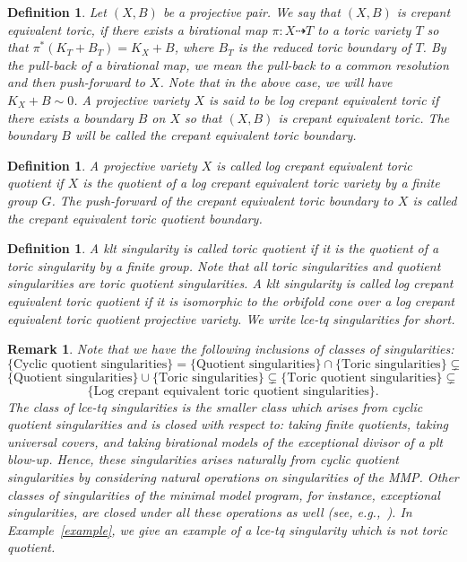 \documentclass{amsart}
\newtheorem{definition}[theorem]{Definition}
\newtheorem{remark}[theorem]{Remark}
\theoremstyle{remark}
\numberwithin{equation}{section}
\begin{document}
\begin{definition}{\em 
Let $(X,B)$ be a projective pair.
We say that $(X,B)$ is {\em crepant equivalent  toric},
if there exists a birational map $\pi\colon X\dashrightarrow T$ 
to a toric variety $T$ 
so that $\pi^*(K_T+B_T)=K_X+B$,
where $B_T$ is the reduced toric boundary of $T$.
By the pull-back of a birational map, we mean the pull-back to a common resolution and then push-forward to $X$.
Note that in the above case, we will have $K_X+B\sim 0$.
A projective variety $X$ is said to be
{\em log crepant equivalent  toric} if there exists a boundary $B$ on $X$ so that $(X,B)$ is crepant equivalent  toric.
The boundary $B$ will be called the {\em crepant equivalent  toric boundary}.
}
\end{definition}

\begin{definition}{\em 
A projective variety $X$ is called
{\em log crepant equivalent  toric quotient}
if $X$ is the quotient of a log crepant equivalent  toric variety by a finite group $G$.
The push-forward of the crepant equivalent  toric boundary to $X$ is called the {\em crepant equivalent  toric quotient boundary}.}
\end{definition}

\begin{definition}
\label{def:lce-tq}
{\em 
A klt singularity is called {\em toric quotient} if it is the quotient of a toric singularity by a finite group.
Note that all toric singularities and quotient singularities are toric quotient singularities.
A klt singularity is called {\em log crepant equivalent  toric quotient} if it is isomorphic to the orbifold cone over a log crepant equivalent  toric quotient projective variety.
We write {\em lce-tq} singularities for short.
}
\end{definition}

\begin{remark}{\em 
Note that we have the following inclusions of classes of singularities:
\[
\{\text{Cyclic quotient singularities}\}
= 
\{\text{Quotient singularities}\} 
\cap 
\{\text{Toric singularities}\} 
\subsetneq 
\]
\[
\{\text{Quotient singularities}\} 
\cup 
\{\text{Toric singularities}\} 
\subsetneq 
\{\text{Toric quotient singularities}\}
\subsetneq  
\]
\[
\{
\text{Log crepant equivalent  toric quotient singularities}
\}.
\]
The class of lce-tq singularities is the smaller class which arises from cyclic quotient singularities
and is closed with respect to: taking finite quotients, taking universal covers, and taking birational models of the exceptional divisor of a plt blow-up.
Hence, these singularities arises naturally from cyclic quotient singularities by considering 
natural operations on singularities of the MMP.
Other classes of singularities of the minimal model program, for instance, exceptional singularities,
are closed under all these operations as well (see, e.g.,~\cite{Mor18a}). In Example~\ref{example}, we give an example of a lce-tq singularity which is not toric quotient.
}
\end{remark} 
\end{document}
